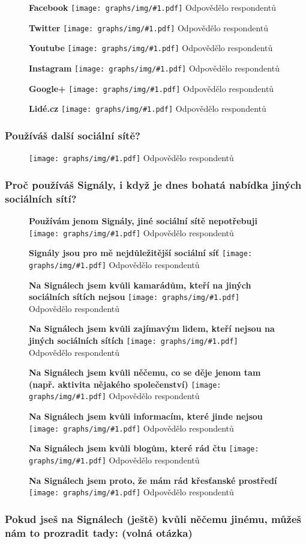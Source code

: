 \documentclass[12pt, a4paper, twoside]{article}
\newcommand{\answercount}[1]{Odpovědělo  respondentů}
\newcommand{\includegraph}[2]{
  \begin{figure}[H]
    \centering
    \textbf{#2}
    \texttt{[image: graphs/img/\#1.pdf]}
    \answercount{#1}
  \end{figure}
}
\begin{document}
\includegraph{jine_site_Facebook}{Facebook}

\includegraph{jine_site_Twitter}{Twitter}

\includegraph{jine_site_Youtube}{Youtube}

\includegraph{jine_site_Instagram}{Instagram}

\includegraph{jine_site_Googleplus}{Google+}

\includegraph{jine_site_Lidecz}{Lidé.cz}

\subsubsection{Používáš další sociální sítě?}

\includegraph{pouzivas_dalsi_socialni_site}{}

\subsubsection{Proč používáš Signály, i když je dnes bohatá nabídka jiných sociálních sítí?}

\includegraph{proc_signaly_jenom_signaly}{Používám jenom Signály, jiné sociální sítě nepotřebuji}

\includegraph{proc_signaly_signaly_nejdulezitejsi}{Signály jsou pro mě nejdůležitější sociální síť}

\includegraph{proc_signaly_kamaradi_kteri_jinde_nejsou}{Na Signálech jsem kvůli kamarádům, kteří na jiných sociálních sítích nejsou}

\includegraph{proc_signaly_zajimavi_lide_kteri_jinde_nejsou}{Na Signálech jsem kvůli zajímavým lidem, kteří nejsou na jiných sociálních sítích}

\includegraph{proc_signaly_jedinecna_aktivita}{Na Signálech jsem kvůli něčemu, co se děje jenom tam (např. aktivita nějakého společenství)}

\includegraph{proc_signaly_jedinecne_informace}{Na Signálech jsem kvůli informacím, které jinde nejsou}

\includegraph{proc_signaly_oblibene_blogy}{Na Signálech jsem kvůli blogům, které rád čtu}

\includegraph{proc_signaly_krestanske_prostredi}{Na Signálech jsem proto, že mám rád křesťanské prostředí}

\subsubsection{Pokud jseš na Signálech (ještě) kvůli něčemu jinému, můžeš nám to prozradit tady: (volná otázka)}
\end{document}
